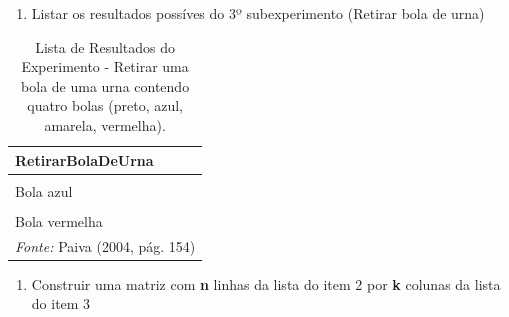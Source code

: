 \documentclass[
]{book}
\providecommand{\tightlist}{%
  \setlength{\itemsep}{0pt}\setlength{\parskip}{0pt}}
\begin{document}
\begin{enumerate}
\def\labelenumi{\arabic{enumi}.}
\setcounter{enumi}{2}
\tightlist
\item
  Listar os resultados possíves do 3º subexperimento (Retirar bola de urna)
\end{enumerate}

\begin{table}

\caption{\label{tab:unnamed-chunk-5}Lista de Resultados do Experimento - Retirar uma bola de uma urna contendo quatro bolas (preto, azul, amarela, vermelha).}
\centering
\begin{tabular}[t]{l}
\toprule
RetirarBolaDeUrna\\
\midrule
\cellcolor{gray!6}{Bola preta}\\
Bola azul\\
\cellcolor{gray!6}{Bola amarela}\\
Bola vermelha\\
\bottomrule
\multicolumn{1}{l}{\rule{0pt}{1em}\textit{Fonte: } Paiva (2004, pág. 154)}\\
\end{tabular}
\end{table}

\begin{enumerate}
\def\labelenumi{\arabic{enumi}.}
\setcounter{enumi}{3}
\tightlist
\item
  Construir uma matriz com \textbf{n} linhas da lista do item 2 por \textbf{k} colunas da lista do item 3
\end{enumerate}
\end{document}

